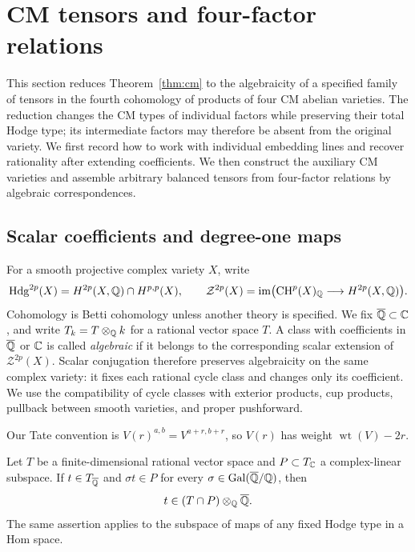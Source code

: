 \section{CM tensors and four-factor relations}\label{sec:tensors}

This section reduces Theorem~\ref{thm:cm} to the algebraicity of a
specified family of tensors in the fourth cohomology of products of four
CM abelian varieties.  The reduction changes the CM types of individual
factors while preserving their total Hodge type; its intermediate
factors may therefore be absent from the original variety.  We first
record how to work with individual embedding lines and recover
rationality after extending coefficients.  We then construct the
auxiliary CM varieties and assemble arbitrary balanced tensors from
four-factor relations by algebraic correspondences.

\subsection{Scalar coefficients and degree-one maps}

For a smooth projective complex variety \(X\), write
\[
 \operatorname{Hdg}^{2p}(X)=H^{2p}(X,\mathbb{Q})\cap H^{p,p}(X),\qquad
 \mathcal Z^{2p}(X)=
 \operatorname{im}\bigl(\operatorname{CH}^p(X)_{\mathbb{Q}}\longrightarrow H^{2p}(X,\mathbb{Q})\bigr).
\]
Cohomology is Betti cohomology unless another theory is specified.  We
fix \(\overline{\mathbb{Q}}\subset\mathbb{C}\), and write \(T_k=T\otimes_{\mathbb{Q}}k\) for a rational
vector space \(T\).  A class with coefficients in \(\overline{\mathbb{Q}}\) or \(\mathbb{C}\)
is called \emph{algebraic} if it belongs to the corresponding scalar
extension of \(\mathcal Z^{2p}(X)\).  Scalar conjugation therefore
preserves algebraicity on the same complex variety: it fixes each
rational cycle class and changes only its coefficient.  We use the
compatibility of cycle classes with exterior products, cup products,
pullback between smooth varieties, and proper pushforward.

Our Tate convention is \(V(r)^{a,b}=V^{a+r,b+r}\), so \(V(r)\) has
weight \(\operatorname{wt}(V)-2r\).

\begin{lemma}\label{lem:trace-descent}
Let \(T\) be a finite-dimensional rational vector space and
\(P\subset T_{\mathbb{C}}\) a complex-linear subspace.  If \(t\in T_{\overline{\mathbb{Q}}}\)
and \(\sigma t\in P\) for every
\(\sigma\in\operatorname{Gal}(\overline{\mathbb{Q}}/\mathbb{Q})\), then
\[
 t\in (T\cap P)\otimes_{\mathbb{Q}}\overline{\mathbb{Q}}.
\]
The same assertion applies to the subspace of maps of any fixed Hodge
type in a Hom space.
\end{lemma}

